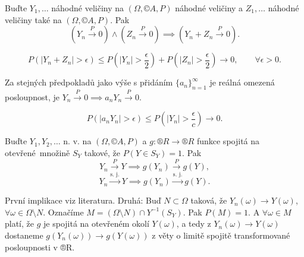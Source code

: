 \documentclass[12pt]{article}					%
\begin{document}
\begin{veta}
	Buďte $Y_1, …$ náhodné veličiny na $(\Omega, ©A, P)$ náhodné veličiny a $Z_1, …$ náhodné veličiny také na $(\Omega, ©A, P)$. Pak
	$$ (Y_n \overset{P}\rightarrow 0) \land (Z_n \overset{P}\rightarrow 0) \implies (Y_n + Z_n \overset{P}\rightarrow 0). $$

	\begin{dukazin}
		$$ P(|Y_n + Z_n| > \epsilon) ≤ P(|Y_n| > \frac{\epsilon}{2}) + P(|Z_n| > \frac{\epsilon}{2}) \rightarrow 0, \qquad \forall \epsilon > 0. $$
	\end{dukazin}
\end{veta}

\begin{veta}
	Za stejných předpokladů jako výše s přidáním $\{a_n\}_{n=1}^∞$ je reálná omezená posloupnost, je $Y_n \overset{P}\rightarrow 0 \implies a_nY_n \overset{P}\rightarrow 0$.

	\begin{dukazin}
		$$ P(|a_n Y_n| > \epsilon) ≤ P(|Y_n| > \frac{\epsilon}{c}) \rightarrow 0. $$
	\end{dukazin}
\end{veta}

\begin{veta}
	Buďte $Y_1, Y_2, …$ n. v. na $(\Omega, ©A, P)$ a $g: ®R \rightarrow ®R$ funkce spojitá na otevřené množině $S_Y$ takové, že $P(Y \in S_Y) = 1$. Pak
	$$ Y_n \overset{P} \rightarrow Y \implies g(Y_n) \overset{P}\rightarrow g(Y), $$
	$$ Y_n \overset{\text{s. j.}}\rightarrow Y \implies g(Y_n) \overset{\text{s. j.}}\rightarrow g(Y). $$

	\begin{dukazin}
		První implikace viz literatura. Druhá: Buď $N \subset \Omega$ taková, že $Y_n(\omega) \rightarrow Y(\omega)$, $\forall \omega \in \Omega \setminus N$. Označíme $M = (\Omega \setminus N) \cap Y^{-1}(S_Y)$. Pak $P(M) = 1$. A $\forall \omega \in M$ platí, že $g$ je spojitá na otevřeném okolí $Y(\omega)$, a tedy z $Y_n(\omega) \rightarrow Y(\omega)$ dostaneme $g(Y_n(\omega)) \rightarrow g(Y(\omega))$ z věty o limitě spojitě transformované posloupnosti v ®R.
	\end{dukazin}
\end{veta}
\end{document}
